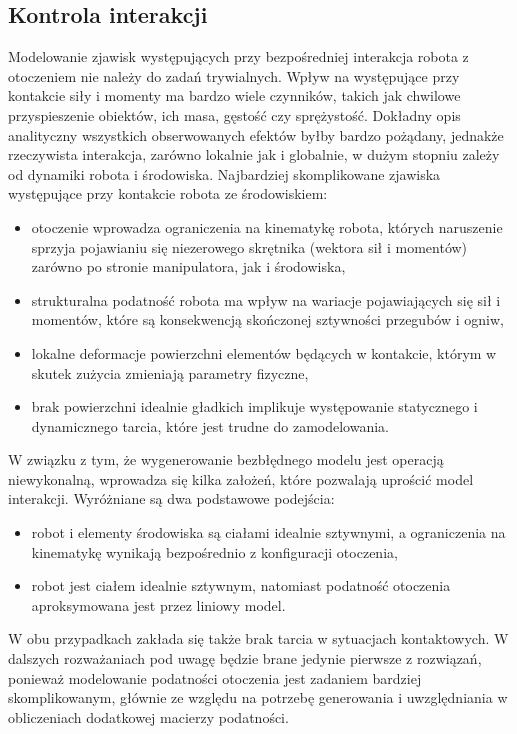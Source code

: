 \documentclass[printmode]{mgr}
\begin{document}
\subsection{Kontrola interakcji}\label{sec:kontrola_interakcji}
Modelowanie zjawisk występujących przy bezpośredniej interakcja robota z otoczeniem nie należy do zadań trywialnych.
Wpływ na występujące przy kontakcie siły i momenty ma bardzo wiele czynników, takich jak chwilowe przyspieszenie obiektów,
ich masa, gęstość czy sprężystość. Dokładny opis analityczny wszystkich obserwowanych efektów byłby bardzo pożądany, jednakże
rzeczywista interakcja, zarówno lokalnie jak i globalnie, w dużym stopniu zależy od dynamiki robota i środowiska.
Najbardziej skomplikowane zjawiska występujące przy kontakcie robota ze środowiskiem:
\begin{itemize}
\item otoczenie wprowadza ograniczenia na kinematykę robota, których naruszenie sprzyja pojawianiu się niezerowego skrętnika 
(wektora sił i momentów) zarówno po stronie manipulatora, jak i środowiska,
\item strukturalna podatność robota ma wpływ na wariacje pojawiających się sił i momentów, które są konsekwencją skończonej sztywności
przegubów i ogniw,
\item lokalne deformacje powierzchni elementów będących w kontakcie, którym w skutek zużycia zmieniają parametry fizyczne,
\item brak powierzchni idealnie gładkich implikuje występowanie statycznego i dynamicznego tarcia, które jest trudne do zamodelowania.
\end{itemize}

W związku z tym, że wygenerowanie bezbłędnego modelu jest operacją niewykonalną, wprowadza się kilka założeń, które
pozwalają uprościć model interakcji. Wyróżniane są dwa podstawowe podejścia:

\begin{itemize}
\item robot i elementy środowiska są ciałami idealnie sztywnymi, a ograniczenia na kinematykę wynikają bezpośrednio z konfiguracji otoczenia,
\item robot jest ciałem idealnie sztywnym, natomiast podatność otoczenia aproksymowana jest przez liniowy model.
\end{itemize}

W obu przypadkach zakłada się także brak tarcia w sytuacjach kontaktowych. W dalszych rozważaniach pod uwagę będzie brane
jedynie pierwsze z rozwiązań, ponieważ modelowanie podatności otoczenia jest zadaniem bardziej skomplikowanym,
głównie ze względu na potrzebę generowania i uwzględniania w obliczeniach dodatkowej macierzy podatności.
\end{document}

